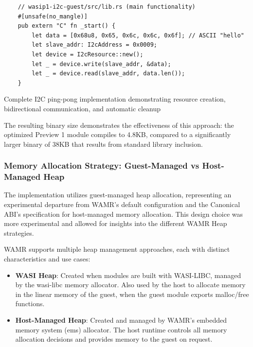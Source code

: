 \begin{listing}[H]
    \begin{verbatim}
    // wasip1-i2c-guest/src/lib.rs (main functionality)
    #[unsafe(no_mangle)]
    pub extern "C" fn _start() {
        let data = [0x68u8, 0x65, 0x6c, 0x6c, 0x6f]; // ASCII "hello"
        let slave_addr: I2cAddress = 0x0009;
        let device = I2cResource::new();
        let _ = device.write(slave_addr, &data);
        let _ = device.read(slave_addr, data.len());
    }
    \end{verbatim}
    \caption{Complete I2C ping-pong implementation demonstrating resource creation, bidirectional communication, and automatic cleanup}
    \label{lst:preview1-main-functionality}
\end{listing}

The resulting binary size demonstrates the effectiveness of this approach: the optimized Preview 1 module compiles to 4.8KB, compared to a significantly larger binary of 38KB that results from standard library inclusion.

\subsubsection{Memory Allocation Strategy: Guest-Managed vs Host-Managed Heap}

The implementation utilizes guest-managed heap allocation, representing an experimental departure from WAMR's default configuration and the Canonical ABI's specification for host-managed memory allocation. This design choice was more experimental and allowed for insights into the different WAMR Heap strategies. 

WAMR supports multiple heap management approaches, each with distinct characteristics and use cases:

\begin{itemize}
    \item \textbf{WASI Heap}: Created when modules are built with WASI-LIBC, managed by the wasi-libc memory allocator. Also used by the host to allocate memory in the linear memory of the guest, when the guest module exports malloc/free functions.
    \item \textbf{Host-Managed Heap}: Created and managed by WAMR's embedded memory system (ems) allocator. The host runtime controls all memory allocation decisions and provides memory to the guest on request.
\end{itemize}

